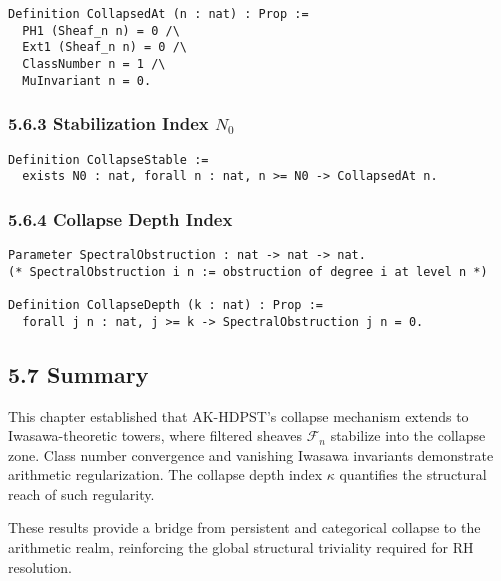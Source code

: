 \documentclass[11pt]{article}
\begin{document}
\begin{lstlisting}[language=Coq, caption=Collapse Conditions per Level, captionpos=b]
Definition CollapsedAt (n : nat) : Prop :=
  PH1 (Sheaf_n n) = 0 /\
  Ext1 (Sheaf_n n) = 0 /\
  ClassNumber n = 1 /\
  MuInvariant n = 0.
\end{lstlisting}

\subsubsection*{5.6.3 Stabilization Index \( N_0 \)}

\begin{lstlisting}[language=Coq, caption=Collapse Stabilization Beyond N0, captionpos=b]
Definition CollapseStable := 
  exists N0 : nat, forall n : nat, n >= N0 -> CollapsedAt n.
\end{lstlisting}

\subsubsection*{5.6.4 Collapse Depth Index}

\begin{lstlisting}[language=Coq, caption=Collapse Depth Index kappa(F), captionpos=b]
Parameter SpectralObstruction : nat -> nat -> nat.
(* SpectralObstruction i n := obstruction of degree i at level n *)

Definition CollapseDepth (k : nat) : Prop :=
  forall j n : nat, j >= k -> SpectralObstruction j n = 0.
\end{lstlisting}

\subsection*{5.7 Summary}

This chapter established that AK-HDPST’s collapse mechanism extends to Iwasawa-theoretic towers, where filtered sheaves \( \mathcal{F}_n \) stabilize into the collapse zone. Class number convergence and vanishing Iwasawa invariants demonstrate arithmetic regularization. The collapse depth index \( \kappa \) quantifies the structural reach of such regularity.

These results provide a bridge from persistent and categorical collapse to the arithmetic realm, reinforcing the global structural triviality required for RH resolution.



\end{document}
